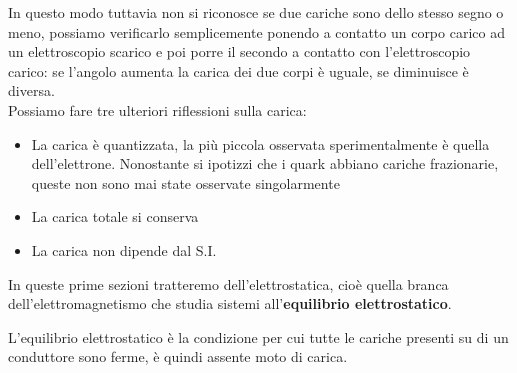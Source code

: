 \documentclass[
10pt, %
a4paper, %
oneside, %
headinclude,footinclude, %
BCOR5mm, %
]{scrartcl}
\begin{document}
In questo modo tuttavia non si riconosce se due cariche sono dello stesso segno o meno, possiamo verificarlo semplicemente ponendo a contatto un corpo carico ad un elettroscopio scarico e poi porre il secondo a contatto con l'elettroscopio carico: se l'angolo aumenta la carica dei due corpi è uguale, se diminuisce è diversa.\\
Possiamo fare tre ulteriori riflessioni sulla carica:
\begin{itemize}
	\item La carica è quantizzata, la più piccola osservata sperimentalmente è quella dell'elettrone. Nonostante si ipotizzi che i quark abbiano cariche frazionarie, queste non sono mai state osservate singolarmente
	\item La carica totale si conserva
	\item La carica non dipende dal S.I.
\end{itemize}
In queste prime sezioni tratteremo dell'elettrostatica, cioè quella branca dell'elettromagnetismo che studia sistemi all'\textbf{equilibrio elettrostatico}.
\begin{definizione}
	L'equilibrio elettrostatico è la condizione per cui tutte le cariche presenti su di un conduttore sono ferme, è quindi assente moto di carica.
\end{definizione}
\end{document}
